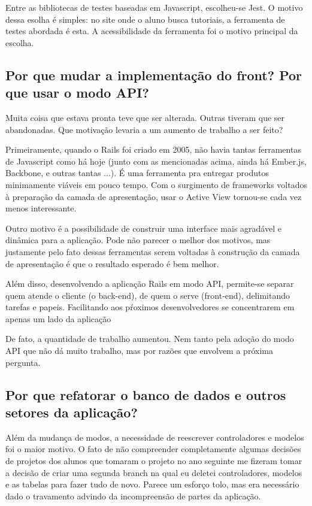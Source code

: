 Entre as bibliotecas de testes baseadas em Javascript, escolheu-se Jest. O motivo dessa esolha é simples:
no site onde o aluno busca tutoriais, a ferramenta de testes abordada é esta. A acessibilidade da ferramenta
foi o motivo principal da escolha.

\subsection{Por que mudar a implementação do front? Por que usar o modo API?}

Muita coisa que estava pronta teve que ser alterada. Outras tiveram que ser abandonadas. Que motivação levaria
a um aumento de trabalho a ser feito?

Primeiramente, quando o Rails foi criado em 2005, não havia tantas ferramentas de Javascript como há hoje
(junto com as mencionadas acima, ainda há Ember.js, Backbone, e outras tantas ...). É uma ferramenta pra
entregar produtos minimamente viáveis em pouco tempo. Com o surgimento de frameworks voltados à preparação
da camada de apresentação, usar o Active View tornou-se cada vez menos interessante.

Outro motivo é a possibilidade de construir uma interface mais agradável e dinâmica para a aplicação. Pode não
parecer o melhor dos motivos, mas justamente pelo fato dessas ferramentas  serem voltadas à construção
da camada de apresentação é que o resultado esperado é bem melhor.

Além disso, desenvolvendo a aplicação Rails em modo API, permite-se separar quem atende o cliente (o back-end),
de quem o serve (front-end), delimitando tarefas e papeis. Facilitando aos pŕoximos desenvolvedores se concentrarem
em apenas um lado da aplicação

De fato, a quantidade de trabalho aumentou. Nem tanto pela adoção do modo API que não dá muito trabalho, mas por
razões que envolvem a próxima pergunta.

\subsection{Por que refatorar o banco de dados e outros setores da aplicação?}
\label{subsec:refatorar}

Além da mudança de modos, a necessidade de reescrever controladores e modelos foi o maior motivo. O fato de não
compreender completamente algumas decisões de projetos dos alunos que tomaram o projeto no ano seguinte me fizeram
tomar a decisão de criar uma segunda branch na qual eu deletei controladores, modelos e as tabelas para fazer tudo
de novo. Parece um esforço tolo, mas era necessário dado o travamento advindo da incompreensão de partes da aplicação.

